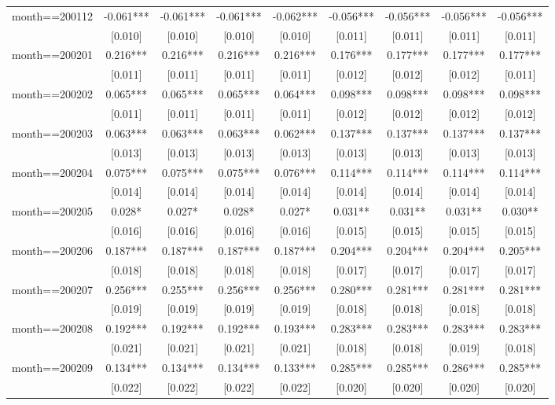 \documentclass[]{article}
\begin{document}
\begin{tabular}{lcccccccc}
month==200112 & -0.061*** & -0.061*** & -0.061*** & -0.062*** & -0.056*** & -0.056*** & -0.056*** & -0.056*** \\
 & [0.010] & [0.010] & [0.010] & [0.010] & [0.011] & [0.011] & [0.011] & [0.011] \\
month==200201 & 0.216*** & 0.216*** & 0.216*** & 0.216*** & 0.176*** & 0.177*** & 0.177*** & 0.177*** \\
 & [0.011] & [0.011] & [0.011] & [0.011] & [0.012] & [0.012] & [0.012] & [0.011] \\
month==200202 & 0.065*** & 0.065*** & 0.065*** & 0.064*** & 0.098*** & 0.098*** & 0.098*** & 0.098*** \\
 & [0.011] & [0.011] & [0.011] & [0.011] & [0.012] & [0.012] & [0.012] & [0.012] \\
month==200203 & 0.063*** & 0.063*** & 0.063*** & 0.062*** & 0.137*** & 0.137*** & 0.137*** & 0.137*** \\
 & [0.013] & [0.013] & [0.013] & [0.013] & [0.013] & [0.013] & [0.013] & [0.013] \\
month==200204 & 0.075*** & 0.075*** & 0.075*** & 0.076*** & 0.114*** & 0.114*** & 0.114*** & 0.114*** \\
 & [0.014] & [0.014] & [0.014] & [0.014] & [0.014] & [0.014] & [0.014] & [0.014] \\
month==200205 & 0.028* & 0.027* & 0.028* & 0.027* & 0.031** & 0.031** & 0.031** & 0.030** \\
 & [0.016] & [0.016] & [0.016] & [0.016] & [0.015] & [0.015] & [0.015] & [0.015] \\
month==200206 & 0.187*** & 0.187*** & 0.187*** & 0.187*** & 0.204*** & 0.204*** & 0.204*** & 0.205*** \\
 & [0.018] & [0.018] & [0.018] & [0.018] & [0.017] & [0.017] & [0.017] & [0.017] \\
month==200207 & 0.256*** & 0.255*** & 0.256*** & 0.256*** & 0.280*** & 0.281*** & 0.281*** & 0.281*** \\
 & [0.019] & [0.019] & [0.019] & [0.019] & [0.018] & [0.018] & [0.018] & [0.018] \\
month==200208 & 0.192*** & 0.192*** & 0.192*** & 0.193*** & 0.283*** & 0.283*** & 0.283*** & 0.283*** \\
 & [0.021] & [0.021] & [0.021] & [0.021] & [0.018] & [0.018] & [0.019] & [0.018] \\
month==200209 & 0.134*** & 0.134*** & 0.134*** & 0.133*** & 0.285*** & 0.285*** & 0.286*** & 0.285*** \\
 & [0.022] & [0.022] & [0.022] & [0.022] & [0.020] & [0.020] & [0.020] & [0.020] \\

\end{tabular}
\end{document}
